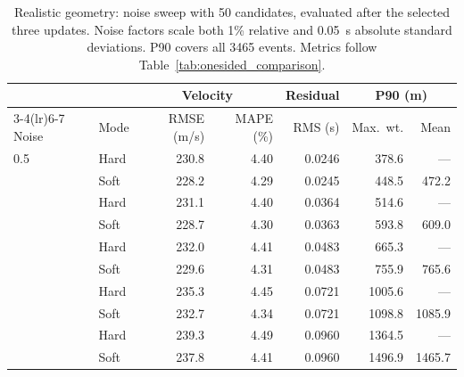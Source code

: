 \begin{table}[!htb]
\centering
\begin{singlespace}
\small
\setlength{\tabcolsep}{3.5pt}
\caption{Realistic geometry: noise sweep with 50 candidates, evaluated after the selected three updates. Noise factors scale both 1\% relative and 0.05~s absolute standard deviations. P90 covers all 3465 events. Metrics follow Table~\ref{tab:onesided_comparison}.}
\label{tab:real_geometry_noise}
\smallskip
\begin{tabular}{llrrrrr}
\toprule
& & \multicolumn{2}{c}{Velocity} & Residual & \multicolumn{2}{c}{P90 (m)} \\
\cmidrule(lr){3-4}\cmidrule(lr){6-7}
Noise & Mode & RMSE (m/s) & MAPE (\%) & RMS (s) & Max.\ wt. & Mean \\
\midrule
0.5 & Hard & 230.8 & 4.40 & 0.0246 & 378.6 & --- \\
 & Soft & 228.2 & 4.29 & 0.0245 & 448.5 & 472.2 \\
\addlinespace
0.75 & Hard & 231.1 & 4.40 & 0.0364 & 514.6 & --- \\
 & Soft & 228.7 & 4.30 & 0.0363 & 593.8 & 609.0 \\
\addlinespace
1 & Hard & 232.0 & 4.41 & 0.0483 & 665.3 & --- \\
 & Soft & 229.6 & 4.31 & 0.0483 & 755.9 & 765.6 \\
\addlinespace
1.5 & Hard & 235.3 & 4.45 & 0.0721 & 1005.6 & --- \\
 & Soft & 232.7 & 4.34 & 0.0721 & 1098.8 & 1085.9 \\
\addlinespace
2 & Hard & 239.3 & 4.49 & 0.0960 & 1364.5 & --- \\
 & Soft & 237.8 & 4.41 & 0.0960 & 1496.9 & 1465.7 \\
\bottomrule
\end{tabular}
\end{singlespace}
\end{table}

